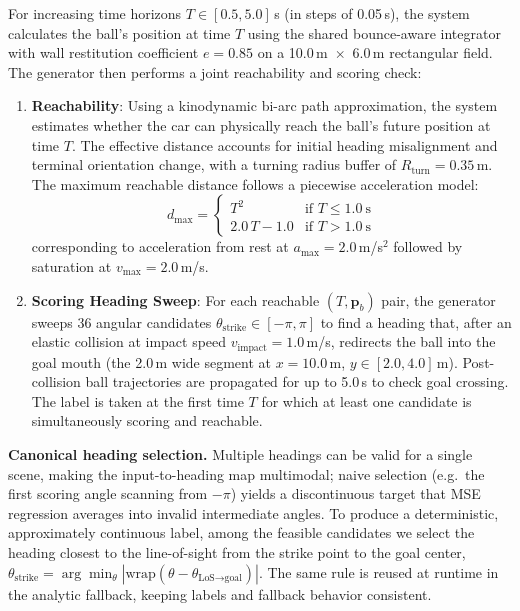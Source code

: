 \documentclass[10pt,twocolumn,letterpaper]{article}
\begin{document}
For increasing time horizons $T \in [0.5, 5.0]$\,s (in steps of
0.05\,s), the system calculates the ball's position at time $T$ using
the shared bounce-aware integrator with wall restitution coefficient
$e = 0.85$ on a 10.0\,m~$\times$~6.0\,m rectangular field. The
generator then performs a joint reachability and scoring check:

\begin{enumerate}
    \item \textbf{Reachability}: Using a kinodynamic bi-arc path
      approximation, the system estimates whether the car can
      physically reach the ball's future position at time $T$. The
      effective distance accounts for initial heading misalignment and
      terminal orientation change, with a turning radius buffer of
      $R_{\text{turn}} = 0.35$\,m. The maximum reachable distance
      follows a piecewise acceleration model:
      \begin{equation}
        d_{\max} =
        \begin{cases}
          T^2 & \text{if } T \leq 1.0~\text{s}\\
          2.0\,T - 1.0 & \text{if } T > 1.0~\text{s}
        \end{cases}
        \label{eq:dmax}
      \end{equation}
      corresponding to acceleration from rest at
      $a_{\max} = 2.0$\,m/s$^2$ followed by saturation at
      $v_{\max} = 2.0$\,m/s.

    \item \textbf{Scoring Heading Sweep}: For each reachable
      $(T, \mathbf{p}_b)$ pair, the generator sweeps 36 angular
      candidates $\theta_{\text{strike}} \in [-\pi, \pi]$ to find a
      heading that, after an elastic collision at impact speed
      $v_{\text{impact}} = 1.0$\,m/s, redirects the ball into the
      goal mouth (the 2.0\,m wide segment at $x = 10.0$\,m,
      $y \in [2.0, 4.0]$\,m). Post-collision ball trajectories are
      propagated for up to 5.0\,s to check goal crossing. The label is
      taken at the first time $T$ for which at least one candidate is
      simultaneously scoring and reachable.
\end{enumerate}

\textbf{Canonical heading selection.} Multiple headings can be valid
for a single scene, making the input-to-heading map multimodal; naive
selection (e.g.\ the first scoring angle scanning from $-\pi$) yields a
discontinuous target that MSE regression averages into invalid
intermediate angles. To produce a deterministic, approximately
continuous label, among the feasible candidates we select the heading
closest to the line-of-sight from the strike point to the goal center,
$\theta_{\text{strike}} = \arg\min_{\theta} |\text{wrap}(\theta -
\theta_{\text{LoS}\to\text{goal}})|$. The same rule is reused at
runtime in the analytic fallback, keeping labels and fallback behavior
consistent.
\end{document}
